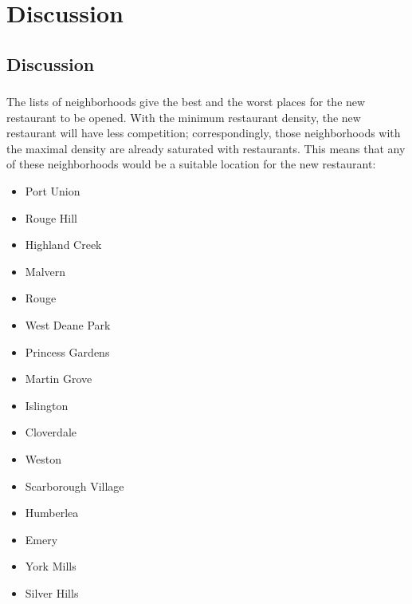 \documentclass[aspectratio=169]{beamer}
\begin{document}

\section{Discussion}

\subsection{Discussion}

\subsubsection{}
\begin{frame}

The lists of neighborhoods give the best and the worst places for the new restaurant to be opened. With the minimum restaurant density, the new restaurant will have less competition; correspondingly, those neighborhoods with the maximal density are already saturated with restaurants. This means that any of these neighborhoods would be a suitable location for the new restaurant:

\begin{multicols}{2}
 \begin{itemize}
  \item Port Union
  \item Rouge Hill
  \item Highland Creek
  \item Malvern
  \item Rouge
  \item West Deane Park
  \item Princess Gardens
  \item Martin Grove
  \end{itemize}
  
\columnbreak

  \begin{itemize}
  \item Islington
  \item Cloverdale
  \item Weston
  \item Scarborough Village
  \item Humberlea
  \item Emery
  \item York Mills
  \item Silver Hills
 \end{itemize}
\end{multicols}
\end{frame}
\end{document}
